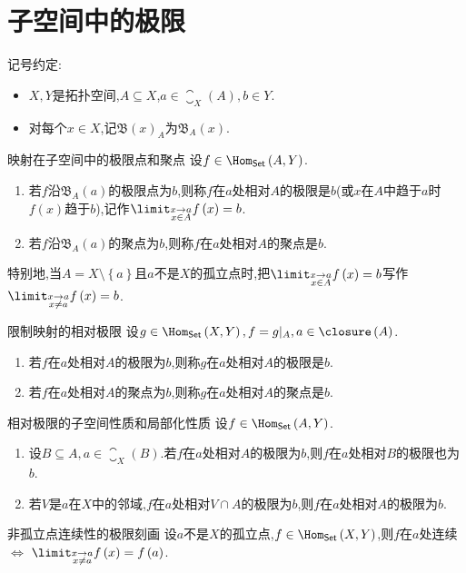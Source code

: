 \section{子空间中的极限}

记号约定:
\begin{itemize}
	\item $X,Y$是拓扑空间,$A\subseteq X$,$a\in\closure_{X}\left(A\right),b\in Y$.
	\item 对每个$x\in X$,记$\mathfrak{B}\left(x\right)_{A}$为$\mathfrak{B}_{A}\left(x\right)$.
\end{itemize}

\begin{definition}{映射在子空间中的极限点和聚点}{}
	设$f\in\Hom_{\mathsf{Set}}\left(A,Y\right)$.
	\begin{enumerate}
		\item 若$f$沿$\mathfrak{B}_{A}\left(a\right)$的极限点为$b$,则称$f$在$a$处相对$A$的极限是$b$(或$x$在$A$中趋于$a$时$f\left(x\right)$趋于$b$),记作$\limit_{\substack{x\to a\\x\in A}}f\left(x\right)=b$.
		\item 若$f$沿$\mathfrak{B}_{A}\left(a\right)$的聚点为$b$,则称$f$在$a$处相对$A$的聚点是$b$.
	\end{enumerate}
	特别地,当$A=X\setminus\left\{a\right\}$且$a$不是$X$的孤立点时,把$\limit_{\substack{x\to a\\x\in A}}f\left(x\right)=b$写作$\limit_{\substack{x\to a\\x\neq a}}f\left(x\right)=b$.
\end{definition}

\begin{definition}{限制映射的相对极限}{}
	设$g\in\Hom_{\mathsf{Set}}\left(X,Y\right),f=g|_{A},a\in\closure\left(A\right)$.
	\begin{enumerate}
		\item 若$f$在$a$处相对$A$的极限为$b$,则称$g$在$a$处相对$A$的极限是$b$.
		\item 若$f$在$a$处相对$A$的聚点为$b$,则称$g$在$a$处相对$A$的聚点是$b$.
	\end{enumerate}
\end{definition}

\begin{proposition}{相对极限的子空间性质和局部化性质}{}
	设$f\in\Hom_{\mathsf{Set}}\left(A,Y\right)$.
	\begin{enumerate}
		\item 设$B\subseteq A,a\in\closure_{X}\left(B\right)$.若$f$在$a$处相对$A$的极限为$b$,则$f$在$a$处相对$B$的极限也为$b$.
		\item 若$V$是$a$在$X$中的邻域,$f$在$a$处相对$V\cap A$的极限为$b$,则$f$在$a$处相对$A$的极限为$b$.
	\end{enumerate}
\end{proposition}

\begin{proposition}{非孤立点连续性的极限刻画}{}
	设$a$不是$X$的孤立点,$f\in\Hom_{\mathsf{Set}}\left(X,Y\right)$,则$f$在$a$处连续$\iff$ $\limit_{\substack{x\to a\\x\neq a}}f\left(x\right)=f\left(a\right)$.
\end{proposition}
